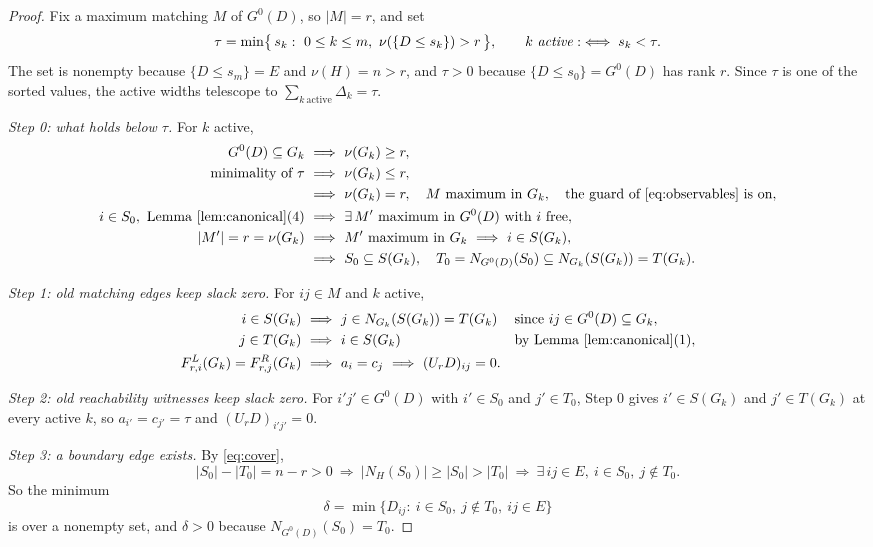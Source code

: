 \documentclass[11pt]{article}
\begin{document}
\begin{proof}
Fix a maximum matching $M$ of $G^{0}(D)$, so $|M|=r$, and set
\[
  \tau=\min\bigl\{\,s_k:\ 0\le k\le m,\ \nu(\{D\le s_k\})>r\,\bigr\},
  \qquad
  \text{$k$ \emph{active}} :\iff s_k<\tau .
\]
The set is nonempty because $\{D\le s_m\}=E$ and $\nu(H)=n>r$, and $\tau>0$
because $\{D\le s_0\}=G^{0}(D)$ has rank $r$.  Since $\tau$ is one of the sorted
values, the active widths telescope to $\sum_{k\ \mathrm{active}}\Delta_k=\tau$.

\emph{Step 0: what holds below $\tau$.}  For $k$ active,
\begin{align*}
  G^{0}(D)\subseteq G_k
    &\ \Longrightarrow\ \nu(G_k)\ge r,\\
  \text{minimality of }\tau
    &\ \Longrightarrow\ \nu(G_k)\le r,\\
  &\ \Longrightarrow\ \nu(G_k)=r,\quad
    \text{$M$ maximum in $G_k$},\quad
    \text{the guard of \eqref{eq:observables} is on},\\
  i\in S_0,\ \text{Lemma~\ref{lem:canonical}(4)}
    &\ \Longrightarrow\ \exists\,M'\ \text{maximum in }G^{0}(D)\ \text{with $i$ free},\\
  |M'|=r=\nu(G_k)
    &\ \Longrightarrow\ \text{$M'$ maximum in $G_k$}\ \Longrightarrow\ i\in S(G_k),\\
  &\ \Longrightarrow\ S_0\subseteq S(G_k),\quad
    T_0=N_{G^{0}(D)}(S_0)\subseteq N_{G_k}(S(G_k))=T(G_k).
\end{align*}

\emph{Step 1: old matching edges keep slack zero.}  For $ij\in M$ and $k$ active,
\begin{align*}
  i\in S(G_k)
    &\ \Longrightarrow\ j\in N_{G_k}(S(G_k))=T(G_k)
    &&\text{since } ij\in G^{0}(D)\subseteq G_k,\\
  j\in T(G_k)
    &\ \Longrightarrow\ i\in S(G_k)
    &&\text{by Lemma~\ref{lem:canonical}(1)},\\
  F^{L}_{r,i}(G_k)=F^{R}_{r,j}(G_k)
    &\ \Longrightarrow\ a_i=c_j
    \ \Longrightarrow\ (U_rD)_{ij}=0 .
\end{align*}

\emph{Step 2: old reachability witnesses keep slack zero.}  For
$i'j'\in G^{0}(D)$ with $i'\in S_0$ and $j'\in T_0$, Step 0 gives
$i'\in S(G_k)$ and $j'\in T(G_k)$ at every active $k$, so
$a_{i'}=c_{j'}=\tau$ and $(U_rD)_{i'j'}=0$.

\emph{Step 3: a boundary edge exists.}  By \eqref{eq:cover},
\[
  |S_0|-|T_0|=n-r>0
  \ \Longrightarrow\ |N_H(S_0)|\ge|S_0|>|T_0|
  \ \Longrightarrow\ \exists\,ij\in E,\ i\in S_0,\ j\notin T_0 .
\]
So the minimum
\begin{equation}
  \delta=\min\{D_{ij}:\ i\in S_0,\ j\notin T_0,\ ij\in E\}
  \label{eq:delta}
\end{equation}
is over a nonempty set, and $\delta>0$ because $N_{G^{0}(D)}(S_0)=T_0$.


\end{proof}
\end{document}
